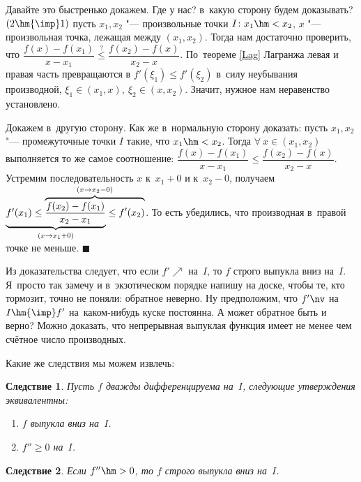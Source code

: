 \documentclass[a4paper,10pt,twoside]{article}
\newtheorem{Sl}{Следствие}[section]
\newenvironment{Proof}
       {\par\noindent{\textbf{Доказательство.}}}
       {\hfill$\scriptstyle\blacksquare$}
\begin{document}
\begin{Proof}
    Давайте это быстренько докажем. Где у нас? в~какую сторону будем доказывать? $(2\hm{\imp}1)$ пусть $x_1,x_2$ "--- произвольные точки $I\colon x_1\hm<x_2$,
    $x$ "--- произвольная точка, лежащая между $(x_1,x_2)$. Тогда нам достаточно проверить, что
    $\dfrac{f(x)-f(x_1)}{x-x_1}\overset{?}{\leq}\dfrac{f(x_2)-f(x)}{x_2-x}$. По~теореме \ref{Lag} Лагранжа левая и правая часть превращаются в
    $f'(\xi_1)\leq f'(\xi_2)$ в~силу неубывания производной, $\xi_1\in(x_1,x),\ \xi_2\in(x,x_2)$. Значит, нужное нам неравенство установлено.

    Докажем в~другую сторону. Как же в~нормальную сторону доказать: пусть $x_1,x_2$ "--- промежуточные точки $I$ такие, что $x_1\hm<x_2$. Тогда
    $\forall\  x\in(x_1,x_2)$ выполняется то же самое соотношение: $\dfrac{f(x)-f(x_1)}{x-x_1}\leq\dfrac{f(x_2)-f(x)}{x_2-x}$. Устремим последовательность
    $x$  к~$x_1+0$ и к~$x_2-0$, получаем $\lefteqn{\underbrace{\phantom{f'(x_1)\leq\dfrac{f(x_2)-f(x_1)}{x_2-x_1}}}_{(x\to x_1+0)}}f'(x_1)
    \leq\overbrace{\dfrac{f(x_2)-f(x_1)}{x_2-x_1}\leq f'(x_2)}^{(x\to x_2-0)}$.
    То есть убедились, что производная в~правой точке не меньше.
\end{Proof}

Из доказательства следует, что если $f'\nearrow$ на~$I$, то $f$ строго выпукла вниз на~$I$. Я~просто так замечу и в~экзотическом порядке напишу
на доске, чтобы те, кто тормозит, точно не поняли: обратное неверно. Ну предположим, что $f'\nv$ на~$I\hm{\imp} f'$ на~каком-нибудь куске постоянна.
А может обратное быть и верно? Можно доказать, что непрерывная выпуклая функция имеет не менее чем счётное число производных.

Какие же следствия мы можем извлечь:

\begin{Sl}
    Пусть $f$ дважды дифференцируема на~$I$, следующие утверждения эквивалентны:

    \begin{enumerate}
        \item $f$ выпукла вниз на~$I$.

        \item $f''\geq0$ на~$I$.
    \end{enumerate}
\end{Sl}

\begin{Sl}
    Если $f''\hm>0$, то $f$ строго выпукла вниз на~$I$.
\end{Sl}
\end{document}

